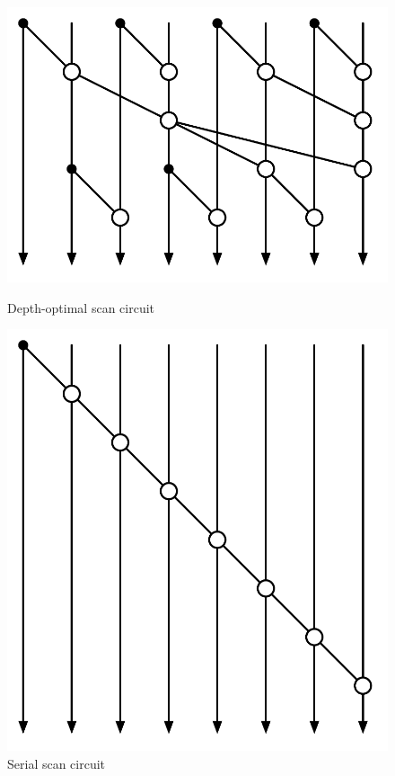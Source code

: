 \begin{figure}[ht]
\centering
\begin{minipage}{.5\textwidth}
  \centering
  \includegraphics[scale=0.4]{scan_circuit.pdf}
  \caption{Depth-optimal scan circuit}
  \label{fig:scan-circuit}
\end{minipage}%
\begin{minipage}{.5\textwidth}
  \centering
  \includegraphics[scale=0.4]{scan_circuit_serial.pdf}
  \caption{Serial scan circuit}
  \label{fig:scan-circuit-serial}
\end{minipage}
\end{figure}

